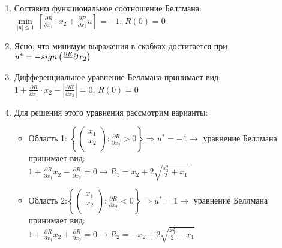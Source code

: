 \documentclass[preprint,russian,a5paper,10pt,twoside,mediummath]{ncc}
\begin{document}
\begin{enumerate}
\item Составим функциональное соотношение Беллмана:
\\$\underset{\left| u \right|\le 1}{\mathop{\min }}\,\left[ \frac{\partial R}{\partial {{x}_{1}}}\cdot {{x}_{2}}+\frac{\partial R}{\partial {{x}_{2}}}u \right]=-1$, $R\left( 0 \right)=0$ 
\item Ясно, что минимум выражения в скобках достигается при 
\\${{u}^{*}}=-sign\left( \frac{\partial R}\\{\partial {{x}_{2}}} \right)$
\item Дифференциальное уравнение Беллмана принимает вид: 
\\$1+\frac{\partial R}{\partial {{x}_{1}}}\cdot {{x}_{2}}-\left| \frac{\partial R}{\partial {{x}_{2}}} \right|=0$, $R\left( 0 \right)=0$
\item Для решения этого уравнения рассмотрим варианты:
\begin{itemize}
\item Область 1:  $\left\{ \left( \begin{array}{*{35}{l}}
   {{x}_{1}}  \\
   {{x}_{2}}  \\
\end{array} \right):\frac{\partial R}{\partial {{x}_{2}}}>0 \right\}\Rightarrow {{u}^{*}}=-1\to $ уравнение Беллмана принимает вид: 
\\$1+\frac{\partial R}{\partial {{x}_{1}}}{{x}_{2}}-\frac{\partial R}{\partial {{x}_{2}}}=0\to {{R}_{1}}={{x}_{2}}+2\sqrt{\frac{x_{2}^{2}}{2}+{{x}_{1}}}$
\item Область 2:$\left\{ \left( \begin{array}{*{35}{l}}
   {{x}_{1}}  \\
   {{x}_{2}}  \\
\end{array} \right):\frac{\partial R}{\partial {{x}_{2}}}<0 \right\}\Rightarrow {{u}^{*}}=1\to $ уравнение Беллмана принимает вид:
\\$1+\frac{\partial R}{\partial {{x}_{1}}}{{x}_{2}}+\frac{\partial R}{\partial {{x}_{2}}}=0\to {{R}_{2}}=-{{x}_{2}}+2\sqrt{\frac{x_{2}^{2}}{2}-{{x}_{1}}}$
\end{itemize}
\end{enumerate}
\end{document}
